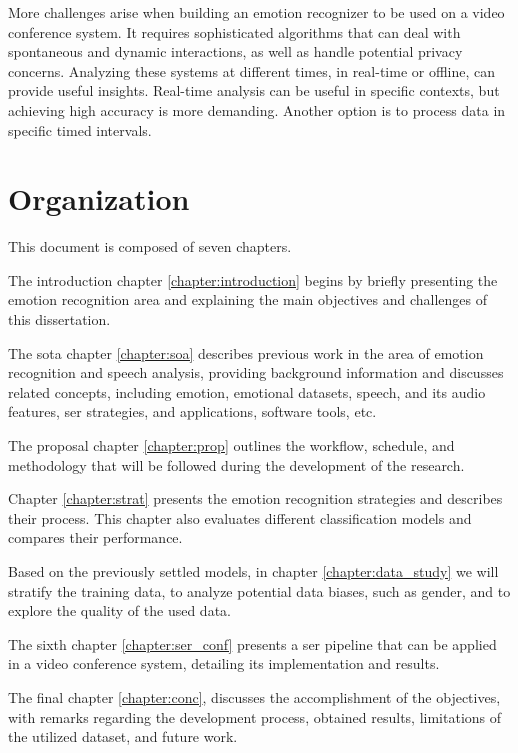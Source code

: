 More challenges arise when building an emotion recognizer to be used on a video conference system. It requires sophisticated algorithms that can deal with spontaneous and dynamic interactions, as well as handle potential privacy concerns. Analyzing these systems at different times, in real-time or offline, can provide useful insights. Real-time analysis can be useful in specific contexts, but achieving high accuracy is more demanding. Another option is to process data in specific timed intervals.

\section{Organization}

This document is composed of seven chapters.

The introduction chapter \ref{chapter:introduction} begins by briefly presenting the emotion recognition area and explaining the main objectives and challenges of this dissertation.

The \ac{sota} chapter \ref{chapter:soa} describes previous work in the area of emotion recognition and speech analysis, providing background information and discusses related concepts, including emotion, emotional datasets, speech, and its audio features, \ac{ser} strategies, and applications, software tools, etc.

The proposal chapter \ref{chapter:prop} outlines the workflow, schedule, and methodology that will be followed during the development of the research.

Chapter \ref{chapter:strat} presents the emotion recognition strategies and describes their process. This chapter also evaluates different classification models and compares their performance.

Based on the previously settled models, in chapter \ref{chapter:data_study} we will stratify the training data, to analyze potential data biases, such as gender, and to explore the quality of the used data.

The sixth chapter \ref{chapter:ser_conf} presents a \ac{ser} pipeline that can be applied in a video conference system, detailing its implementation and results.

The final chapter \ref{chapter:conc}, discusses the accomplishment of the objectives, with remarks regarding the development process, obtained results, limitations of the utilized dataset, and future work.